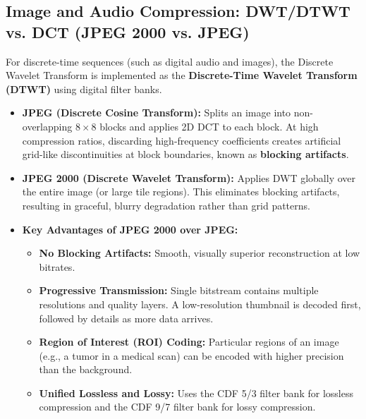 \documentclass[12pt,a4paper]{article}
\begin{document}
\subsection{Image and Audio Compression: DWT/DTWT vs. DCT (JPEG 2000 vs. JPEG)}
For discrete-time sequences (such as digital audio and images), the Discrete Wavelet Transform is implemented as the \textbf{Discrete-Time Wavelet Transform (DTWT)} using digital filter banks.
\begin{itemize}[leftmargin=*, itemsep=4pt]
  \item \textbf{JPEG (Discrete Cosine Transform):} Splits an image into non-overlapping $8 \times 8$ blocks and applies 2D DCT to each block. At high compression ratios, discarding high-frequency coefficients creates artificial grid-like discontinuities at block boundaries, known as \textbf{blocking artifacts}.
  \item \textbf{JPEG 2000 (Discrete Wavelet Transform):} Applies DWT globally over the entire image (or large tile regions). This eliminates blocking artifacts, resulting in graceful, blurry degradation rather than grid patterns. 
  \item \textbf{Key Advantages of JPEG 2000 over JPEG:}
        \begin{itemize}[leftmargin=*, itemsep=2.5pt, topsep=2pt]
          \item \textbf{No Blocking Artifacts:} Smooth, visually superior reconstruction at low bitrates.
          \item \textbf{Progressive Transmission:} Single bitstream contains multiple resolutions and quality layers. A low-resolution thumbnail is decoded first, followed by details as more data arrives.
          \item \textbf{Region of Interest (ROI) Coding:} Particular regions of an image (e.g., a tumor in a medical scan) can be encoded with higher precision than the background.
          \item \textbf{Unified Lossless and Lossy:} Uses the CDF 5/3 filter bank for lossless compression and the CDF 9/7 filter bank for lossy compression.
        \end{itemize}
\end{itemize}
\end{document}
